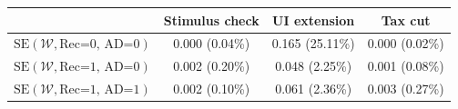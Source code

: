 \begin{tabular}{@{}lccc@{}}
\toprule
                          & Stimulus check      & UI extension    & Tax cut    \\  \midrule
$\mathrm{SE}(\mathcal{W}, \text{Rec=0, AD=0})$ & 0.000 (0.04\%)  & 0.165 (25.11\%)  & 0.000 (0.02\%)     \\
$\mathrm{SE}(\mathcal{W}, \text{Rec=1, AD=0})$ & 0.002 (0.20\%)  & 0.048 (2.25\%)  & 0.001 (0.08\%)     \\
$\mathrm{SE}(\mathcal{W}, \text{Rec=1, AD=1})$ & 0.002 (0.10\%)  & 0.061 (2.36\%)  & 0.003 (0.27\%)     \\ \bottomrule
\end{tabular}
